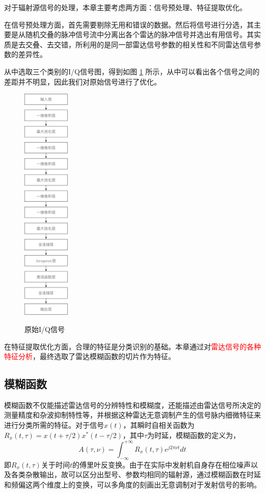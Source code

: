 对于辐射源信号的处理，本章主要考虑两方面：信号预处理、特征提取优化。

在信号预处理方面，首先需要剔除无用和错误的数据。然后将信号进行分选，其主要是从随机交叠的脉冲信号流中分离出各个雷达的脉冲信号并选出有用信号。其实质是去交叠、去交错，所利用的是同一部雷达信号参数的相关性和不同雷达信号参数的差异性。

从中选取三个类别的I/Q信号图，得到如图 \ref{fig:IQs} 所示，从中可以看出各个信号之间的差距并不明显，因此我们对原始信号进行了优化。
\begin{figure}[H]
	\centering
	\includegraphics[width=0.2\textwidth]{figures/struct_emitter.pdf}
	\label{fig:IQs}
	\caption{原始I/Q信号}
\end{figure}

在特征提取优化方面，合理的特征是分类识别的基础。本章通过对\textcolor{red}{雷达信号的各种特征分析}，最终选取了雷达模糊函数的切片作为特征。

\subsection{模糊函数}

模糊函数不仅能描述雷达信号的分辨特性和模糊度，还能描述由雷达信号所决定的测量精度和杂波抑制特性等，并根据这种雷达无意调制产生的信号脉内细微特征来进行分类所需的特征。对于信号$x(t)$，其瞬时自相关函数为$R_x(t,\tau)=x(t+\tau/2)x^{*}(t-\tau/2)$，其中$\tau$为时延，模糊函数的定义为，
\begin{equation}
A(\tau,\nu) = \int_{-\infty}^{+\infty}R_x(t,\tau)e^{j2\pi\nu t}dt
\label{equ:defineaf}
\end{equation}
即$R_x(t,\tau)$关于时间$t$的傅里叶反变换。由于在实际中发射机自身存在相位噪声以及各类杂散输出，故可以区分出型号、参数均相同的辐射源，通过模糊函数在时延和频偏这两个维度上的变换，可以多角度的刻画出无意调制对于发射信号的影响。

